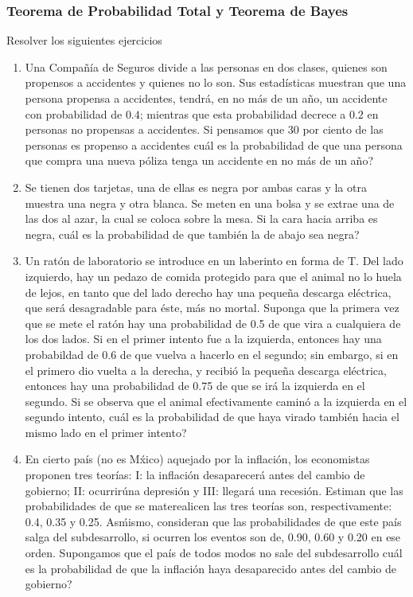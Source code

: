 \subsubsection*{Teorema de Probabilidad Total y Teorema de Bayes}
\begin{Ejer} Resolver los siguientes ejercicios

\begin{enumerate}

\item Una Compa\~n\'ia de Seguros divide a las personas en dos clases, quienes son propensos a accidentes y quienes no lo son. Sus estad\'isticas muestran que una persona propensa a accidentes, tendr\'a, en no m\'as de un a\~no, un accidente con probabilidad de $0.4$; mientras que esta probabilidad decrece a $0.2$ en personas no propensas a accidentes. Si pensamos que 30 por ciento de las personas es propenso a accidentes cu\'al es la probabilidad de que una persona que compra una nueva p\'oliza tenga un accidente en no m\'as de un a\~no?

\item Se tienen dos tarjetas, una de ellas es negra por ambas caras y la otra muestra una negra y otra blanca. Se meten en una bolsa y se extrae una de las dos al azar, la cual se coloca sobre la mesa. Si la cara hacia arriba es negra,  cu\'al es la probabilidad de que tambi\'en la de abajo sea negra?

\item Un rat\'on de laboratorio se introduce en un laberinto en forma de T. Del lado izquierdo, hay un pedazo de comida protegido para que el animal  no lo huela de lejos, en tanto que del lado derecho hay una peque\~na descarga el\'ectrica, que ser\'a desagradable para \'este, m\'as no mortal. Suponga que la primera vez que se mete el rat\'on hay una probabilidad de 0.5 de que vira a cualquiera de los dos lados. Si en el primer intento fue a la izquierda, entonces hay una probabildad de 0.6 de que vuelva a hacerlo en el segundo; sin embargo, si en el primero dio vuelta a la derecha, y recibi\'o la peque\~na descarga el\'ectrica, entonces hay una probabilidad de 0.75 de que se ir\'a la izquierda en el segundo. Si se observa que el animal efectivamente camin\'o a la izquierda en el segundo intento,  cu\'al es la probabilidad de que haya virado tambi\'en hacia el mismo lado en el primer intento?

\item En cierto pa\'is (no es M\'xico) aquejado por la inflaci\'on, los economistas proponen tres teor\'ias: I: la inflaci\'on desaparecer\'a antes del cambio de gobierno; II: ocurrir\' una depresi\'on y III: llegar\'a una recesi\'on. Estiman que las probabilidades de que se materealicen las tres teor\'ias son, respectivamente: 0.4, 0.35 y 0.25. As\' mismo, consideran que las probabilidades de que este pa\'is salga del subdesarrollo, si ocurren los eventos son de, 0.90, 0.60 y 0.20 en ese orden. Supongamos que el pa\'is de todos modos no sale del subdesarrollo  cu\'al es la probabilidad de que la inflaci\'on haya desaparecido antes del cambio de gobierno?


\end{enumerate}
\end{Ejer}
